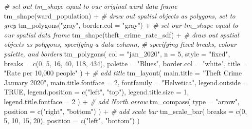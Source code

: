 \documentclass[
]{book}
\newenvironment{Shaded}{\begin{snugshade}}{\end{snugshade}}
\newcommand{\AttributeTok}[1]{\textcolor[rgb]{0.77,0.63,0.00}{#1}}
\newcommand{\CommentTok}[1]{\textcolor[rgb]{0.56,0.35,0.01}{\textit{#1}}}
\newcommand{\ConstantTok}[1]{\textcolor[rgb]{0.00,0.00,0.00}{#1}}
\newcommand{\DecValTok}[1]{\textcolor[rgb]{0.00,0.00,0.81}{#1}}
\newcommand{\FunctionTok}[1]{\textcolor[rgb]{0.00,0.00,0.00}{#1}}
\newcommand{\NormalTok}[1]{#1}
\newcommand{\SpecialCharTok}[1]{\textcolor[rgb]{0.00,0.00,0.00}{#1}}
\newcommand{\StringTok}[1]{\textcolor[rgb]{0.31,0.60,0.02}{#1}}
\begin{document}
\begin{Shaded}
\begin{Highlighting}[]
\CommentTok{\# set out tm\_shape equal to our original ward data frame}
\FunctionTok{tm\_shape}\NormalTok{(ward\_population) }\SpecialCharTok{+}
  \CommentTok{\# draw out spatial objects as polygons, set to grey}
  \FunctionTok{tm\_polygons}\NormalTok{(}\StringTok{"gray"}\NormalTok{, }\AttributeTok{border.col =} \StringTok{"gray"}\NormalTok{) }\SpecialCharTok{+}
  \CommentTok{\# set our tm\_shape equal to our spatial data frame}
  \FunctionTok{tm\_shape}\NormalTok{(theft\_crime\_rate\_sdf) }\SpecialCharTok{+}
  \CommentTok{\# draw out spatial objects as polygons, specifying a data column,}
  \CommentTok{\# specifying fixed breaks, colour palette, and borders}
  \FunctionTok{tm\_polygons}\NormalTok{(}
    \AttributeTok{col =} \StringTok{"jan\_2020"}\NormalTok{, }\AttributeTok{n =} \DecValTok{5}\NormalTok{, }\AttributeTok{style =} \StringTok{"fixed"}\NormalTok{,}
    \AttributeTok{breaks =} \FunctionTok{c}\NormalTok{(}\DecValTok{0}\NormalTok{, }\DecValTok{5}\NormalTok{, }\DecValTok{16}\NormalTok{, }\DecValTok{40}\NormalTok{, }\DecValTok{118}\NormalTok{, }\DecValTok{434}\NormalTok{),}
    \AttributeTok{palette =} \StringTok{"Blues"}\NormalTok{, }\AttributeTok{border.col =} \StringTok{"white"}\NormalTok{,}
    \AttributeTok{title =} \StringTok{"Rate per 10,000 people"}
\NormalTok{  ) }\SpecialCharTok{+}
  \CommentTok{\# add title}
  \FunctionTok{tm\_layout}\NormalTok{(}
    \AttributeTok{main.title =} \StringTok{"Theft Crime January 2020"}\NormalTok{,}
    \AttributeTok{main.title.fontface =} \DecValTok{2}\NormalTok{,}
    \AttributeTok{fontfamily =} \StringTok{"Helvetica"}\NormalTok{,}
    \AttributeTok{legend.outside =} \ConstantTok{TRUE}\NormalTok{,}
    \AttributeTok{legend.position =} \FunctionTok{c}\NormalTok{(}\StringTok{"left"}\NormalTok{, }\StringTok{"top"}\NormalTok{),}
    \AttributeTok{legend.title.size =} \DecValTok{1}\NormalTok{,}
    \AttributeTok{legend.title.fontface =} \DecValTok{2}
\NormalTok{  ) }\SpecialCharTok{+}
  \CommentTok{\# add North arrow}
  \FunctionTok{tm\_compass}\NormalTok{(}
    \AttributeTok{type =} \StringTok{"arrow"}\NormalTok{,}
    \AttributeTok{position =} \FunctionTok{c}\NormalTok{(}\StringTok{"right"}\NormalTok{, }\StringTok{"bottom"}\NormalTok{)}
\NormalTok{  ) }\SpecialCharTok{+}
  \CommentTok{\# add scale bar}
  \FunctionTok{tm\_scale\_bar}\NormalTok{(}
    \AttributeTok{breaks =} \FunctionTok{c}\NormalTok{(}\DecValTok{0}\NormalTok{, }\DecValTok{5}\NormalTok{, }\DecValTok{10}\NormalTok{, }\DecValTok{15}\NormalTok{, }\DecValTok{20}\NormalTok{),}
    \AttributeTok{position =} \FunctionTok{c}\NormalTok{(}\StringTok{"left"}\NormalTok{, }\StringTok{"bottom"}\NormalTok{)}
\NormalTok{  )}
\end{Highlighting}
\end{Shaded}
\end{document}
